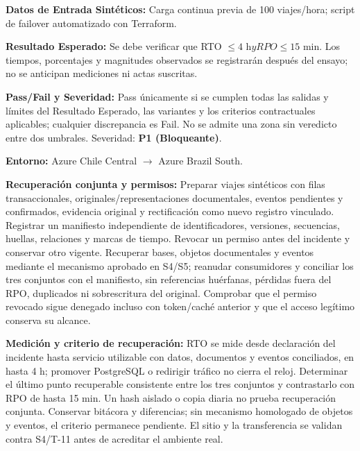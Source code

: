 \par\noindent \textbf{Datos de Entrada Sintéticos:} Carga continua previa de 100 viajes/hora; script de failover automatizado con Terraform.\par
\par\noindent \textbf{Resultado Esperado:} Se debe verificar que RTO $\le 4\text{ h} y RPO \le 15\text{ min}$. Los tiempos, porcentajes y magnitudes observados se registrarán después del ensayo; no se anticipan mediciones ni actas suscritas.\par
\par\noindent \textbf{Pass/Fail y Severidad:} Pass únicamente si se cumplen todas las salidas y límites del Resultado Esperado, las variantes y los criterios contractuales aplicables; cualquier discrepancia es Fail. No se admite una zona sin veredicto entre dos umbrales. Severidad: \textbf{P1 (Bloqueante)}.\par
\par\noindent \textbf{Entorno:} Azure Chile Central $\rightarrow$ Azure Brazil South.\par



\par\noindent\textbf{Recuperación conjunta y permisos:} Preparar viajes sintéticos con filas transaccionales, originales/representaciones documentales, eventos pendientes y confirmados, evidencia original y rectificación como nuevo registro vinculado. Registrar un manifiesto independiente de identificadores, versiones, secuencias, huellas, relaciones y marcas de tiempo. Revocar un permiso antes del incidente y conservar otro vigente. Recuperar bases, objetos documentales y eventos mediante el mecanismo aprobado en S4/S5; reanudar consumidores y conciliar los tres conjuntos con el manifiesto, sin referencias huérfanas, pérdidas fuera del RPO, duplicados ni sobrescritura del original. Comprobar que el permiso revocado sigue denegado incluso con token/caché anterior y que el acceso legítimo conserva su alcance.\par

\par\noindent\textbf{Medición y criterio de recuperación:} RTO se mide desde declaración del incidente hasta servicio utilizable con datos, documentos y eventos conciliados, en hasta 4 h; promover PostgreSQL o redirigir tráfico no cierra el reloj. Determinar el último punto recuperable consistente entre los tres conjuntos y contrastarlo con RPO de hasta 15 min. Un hash aislado o copia diaria no prueba recuperación conjunta. Conservar bitácora y diferencias; sin mecanismo homologado de objetos y eventos, el criterio permanece pendiente. El sitio y la transferencia se validan contra S4/T-11 antes de acreditar el ambiente real.\par


